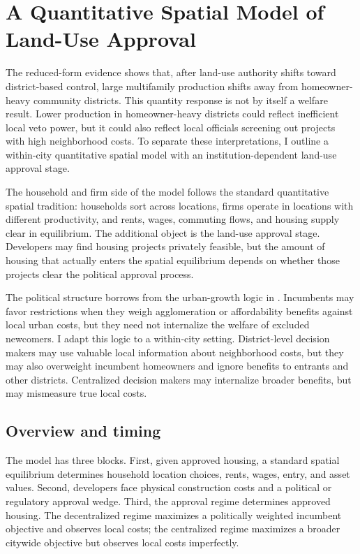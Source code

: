 \section{A Quantitative Spatial Model of Land-Use Approval}
\label{sec:model}

The reduced-form evidence shows that, after land-use authority shifts toward district-based control, large multifamily production shifts away from homeowner-heavy community districts.
This quantity response is not by itself a welfare result.
Lower production in homeowner-heavy districts could reflect inefficient local veto power, but it could also reflect local officials screening out projects with high neighborhood costs.
To separate these interpretations, I outline a within-city quantitative spatial model with an institution-dependent land-use approval stage.

The household and firm side of the model follows the standard quantitative spatial tradition: households sort across locations, firms operate in locations with different productivity, and rents, wages, commuting flows, and housing supply clear in equilibrium.
The additional object is the land-use approval stage.
Developers may find housing projects privately feasible, but the amount of housing that actually enters the spatial equilibrium depends on whether those projects clear the political approval process.

The political structure borrows from the urban-growth logic in \citet{duranton_urban_2023}.
Incumbents may favor restrictions when they weigh agglomeration or affordability benefits against local urban costs, but they need not internalize the welfare of excluded newcomers.
I adapt this logic to a within-city setting.
District-level decision makers may use valuable local information about neighborhood costs, but they may also overweight incumbent homeowners and ignore benefits to entrants and other districts.
Centralized decision makers may internalize broader benefits, but may mismeasure true local costs.

\subsection{Overview and timing}

The model has three blocks.
First, given approved housing, a standard spatial equilibrium determines household location choices, rents, wages, entry, and asset values.
Second, developers face physical construction costs and a political or regulatory approval wedge.
Third, the approval regime determines approved housing.
The decentralized regime maximizes a politically weighted incumbent objective and observes local costs; the centralized regime maximizes a broader citywide objective but observes local costs imperfectly.

